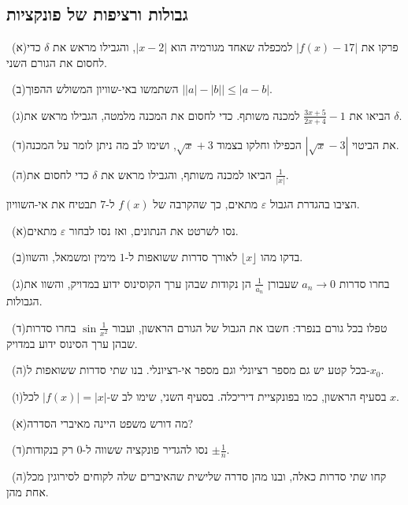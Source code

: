 \documentclass[12pt, a4paper]{article}
\begin{document}
\subsection*{גבולות ורציפות של פונקציות}
\noindent {}\ (א)\enskip פרקו את $|f(x)-17|$ למכפלה שאחד מגורמיה הוא $|x-2|$, והגבילו מראש את $\delta$ כדי לחסום את הגורם השני.\par\smallskip
\noindent {}\ (ב)\enskip השתמשו באי-שוויון המשולש ההפוך $\big||a|-|b|\big|\le|a-b|$.\par\smallskip
\noindent {}\ (ג)\enskip הביאו את $\frac{3x+5}{2x+4}-1$ למכנה משותף. כדי לחסום את המכנה מלמטה, הגבילו מראש את $\delta$.\par\smallskip
\noindent {}\ (ד)\enskip את הביטוי $\left|\sqrt x-3\right|$ הכפילו וחלקו בצמוד $\sqrt x+3$, ושימו לב מה ניתן לומר על המכנה.\par\smallskip
\noindent {}\ (ה)\enskip הביאו למכנה משותף, והגבילו מראש את $\delta$ כדי לחסום את $\frac1{|x|}$.\par\smallskip
\noindent {}\enskip הציבו בהגדרת הגבול $\varepsilon$ מתאים, כך שהקרבה של $f(x)$ ל-$7$ תבטיח את אי-השוויון.\par\smallskip
\noindent {}\ (א)\enskip נסו לשרטט את הנתונים, ואז נסו לבחור $\varepsilon$ מתאים.\par\smallskip
\noindent {}\ (ב)\enskip בדקו מהו $\lfloor x\rfloor$ לאורך סדרות ששואפות ל-$1$ מימין ומשמאל, והשוו.\par\smallskip
\noindent {}\ (ג)\enskip בחרו סדרות $a_n\to0$ שעבורן $\frac1{a_n}$ הן נקודות שבהן ערך הקוסינוס ידוע במדויק, והשוו את הגבולות.\par\smallskip
\noindent {}\ (ד)\enskip טפלו בכל גורם בנפרד: חשבו את הגבול של הגורם הראשון, ועבור $\sin\frac1{x^2}$ בחרו סדרות שבהן ערך הסינוס ידוע במדויק.\par\smallskip
\noindent {}\ (ה)\enskip בכל קטע יש גם מספר רציונלי וגם מספר אי-רציונלי. בנו שתי סדרות ששואפות ל-$x_0$.\par\smallskip
\noindent {}\ (ו)\enskip בסעיף הראשון, כמו בפונקציית דיריכלה. בסעיף השני, שימו לב ש-$|f(x)|=|x|$ לכל $x$.\par\smallskip
\noindent {}\ (א)\enskip מה דורש משפט היינה מאיברי הסדרה?\par\smallskip
\noindent {}\ (ד)\enskip נסו להגדיר פונקציה ששווה ל-$0$ רק בנקודות $\pm\frac1n$.\par\smallskip
\noindent {}\ (ה)\enskip קחו שתי סדרות כאלה, ובנו מהן סדרה שלישית שהאיברים שלה לקוחים לסירוגין מכל אחת מהן.\par\smallskip
\end{document}
